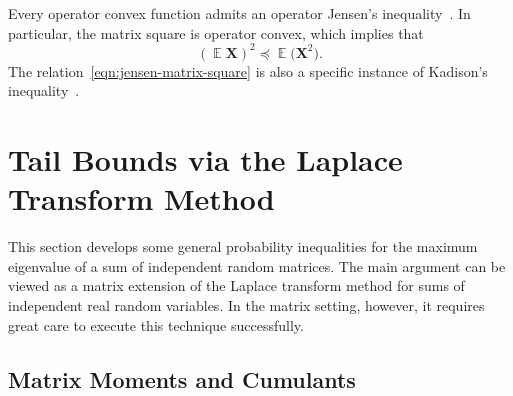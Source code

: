\documentclass[11pt,letterpaper,twoside,reqno,draft]{amsart}
\theoremstyle{remark}
\numberwithin{equation}{section}
\numberwithin{thm}{section}
\begin{document}
Every operator convex function admits an operator Jensen's inequality~\cite{HP03:Jensens-Operator}.  In particular, the matrix square is operator convex, which implies that
\begin{equation} \label{eqn:jensen-matrix-square}
({\operatorname{\mathbb{E}}} {\bm{{X}}})^2 {\preccurlyeq} {\operatorname{\mathbb{E}}} \bigl({\bm{{X}}}^2 \bigr).
\end{equation}
The relation~\eqref{eqn:jensen-matrix-square} is also a specific instance of Kadison's inequality~\cite[Thm.~2.3.2]{Bha07:Positive-Definite}.

\section{Tail Bounds via the Laplace Transform Method} \label{sec:laplace-transform}

This section develops some general probability inequalities for the maximum eigenvalue of a sum of independent random matrices.  The main argument can be viewed as a matrix extension of the Laplace transform method for sums of independent real random variables.  In the matrix setting, however, it requires great care to execute this technique successfully.

\subsection{Matrix Moments and Cumulants} \label{sec:mom-cum}
\end{document}
